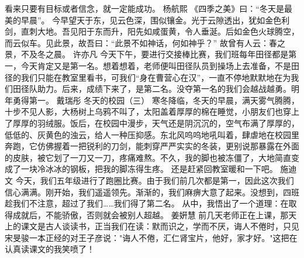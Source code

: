 {}看来只要有目标或者信念，就一定能成功。\markdownRendererInterblockSeparator
{}\markdownRendererInterblockSeparator
{}杨航熙\markdownRendererInterblockSeparator
{}《四季之美》曰：“冬天是最美的早晨”。\markdownRendererInterblockSeparator
{}今早望天于东，见云色深，围似镶金。光于云隙透出，犹如金色利剑，直刺大地。吾见阳于东而升，阳先如咸蛋黄，令人垂涎。后如金色火球腾空，而云似车。见此景，故吾曰：“此景不如神话，何如神乎？”\markdownRendererInterblockSeparator
{}故曾有人云：春之景，不及冬之晨。\markdownRendererInterblockSeparator
{}\markdownRendererInterblockSeparator
{}许亦凡\markdownRendererInterblockSeparator
{}今天下午，要进行交接棒比赛，我们班每年田径都是第一，今天肯定又是第一名。想着想着，老师便叫田径队员到操场上去准备，不是田径的我们只能在教室里看书，可我们“身在曹营心在汉”，一直不停地默默地在为我们田径队助力。后来，成绩下来了，是第二名。没夺第一名的我们会越战越勇。明年勇得第一。\markdownRendererInterblockSeparator
{}\markdownRendererInterblockSeparator
{}戴瑞彤\markdownRendererInterblockSeparator
{}冬天的校园（三）\markdownRendererInterblockSeparator
{}寒冬降临，冬天的早晨，满天雾气腾腾，十步不见人影，大杨树上乌鸦不叫了，太阳盖着厚厚的棉在睡觉，小朋友们也穿上了厚厚的羽绒服。饭后，在校园中漫步，天气还是阴沉沉的，空气布满了厚厚的，低低的、灰黄色的浊云，给人一种压抑感。东北风呜呜地吼叫着，肆虐地在校园里奔跑，它仿佛握着一把锐利的刀剑，能刺穿严严实实的冬装，更别说那暴露在外面的皮肤，被它划了一刀又一刀，疼痛难熬。不久，我的脚也被冻僵了，大地简直变成了一块冷冰冰的钢板，把我的脚冻得生疼。\markdownRendererInterblockSeparator
{}还是赶紧回教室暖和一下吧。\markdownRendererInterblockSeparator
{}\markdownRendererInterblockSeparator
{}施迪文\markdownRendererInterblockSeparator
{}今天，我们五年级进行了跑圈比赛。由于我们前几次都是第一，因此这次我们信心满满。刚开始，我们遥遥领先。渐渐的，我们麻痹大意了起来。没想到，四班趁我们不注意，超过了我们……我们得了第二名。\markdownRendererInterblockSeparator
{}从中，我悟出了一个道理：在取得成就后，不能骄傲，否则就会被别人超越。\markdownRendererInterblockSeparator
{}\markdownRendererInterblockSeparator
{}姜姸慧\markdownRendererInterblockSeparator
{}前几天老师正在上课，那天上的课文是古人谈读书，正当我们在读：默而识之，学而不厌，诲人不倦时，只见宋旻骏一本正经的对王子彦说："诲人不倦，汇仁肾宝片，他好，家才好。"这把在认真读课文的我笑喷了！\markdownRendererInterblockSeparator
{}\markdownRendererInterblockSeparator
